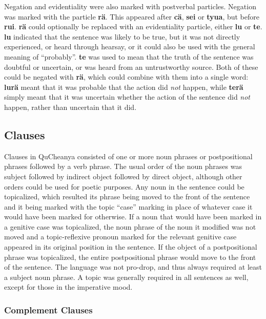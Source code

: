 \documentclass{article}
\begin{document}
Negation and evidentiality were also marked with postverbal particles.  Negation was marked with the particle \textbf{r\"a}.  This appeared after \textbf{c\"a}, \textbf{sei} or \textbf{tyua}, but before \textbf{rui}.  \textbf{r\"a} could optionally be replaced with an evidentiality particle, either \textbf{lu} or \textbf{te}.  \textbf{lu} indicated that the sentence was likely to be true, but it was not directly experienced, or heard through hearsay, or it could also be used with the general meaning of ``probably''.  \textbf{te} was used to mean that the truth of the sentence was doubtful or uncertain, or was heard from an untrustworthy source.  Both of these could be negated with \textbf{r\"a}, which could combine with them into a single word: \textbf{lur\"a} meant that it was probable that the action did \emph{not} happen, while \textbf{ter\"a} simply meant that it was uncertain whether the action of the sentence did \emph{not} happen, rather than uncertain that it did.

\subsection{Clauses}

Clauses in QuCheanya consisted of one or more noun phrases or postpositional phrases followed by a verb phrase.  The usual order of the noun phrases was subject followed by indirect object followed by direct object, although other orders could be used for poetic purposes.  Any noun in the sentence could be topicalized, which resulted its phrase being moved to the front of the sentence and it being marked with the topic ``case'' marking in place of whatever case it would have been marked for otherwise.  If a noun that would have been marked in a genitive case was topicalized, the noun phrase of the noun it modified was not moved and a topic-reflexive pronoun marked for the relevant genitive case appeared in its original position in the sentence.  If the object of a postpositional phrase was topicalized, the entire postpositional phrase would move to the front of the sentence.  The language was not pro-drop, and thus always required at least a subject noun phrase.  A topic was generally required in all sentences as well, except for those in the imperative mood.

\subsubsection{Complement Clauses}
\end{document}
